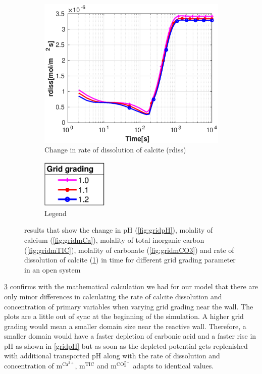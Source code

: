 \begin{figure}[!h]
        \hfill
        \begin{subfigure}{.5\linewidth}
            \centering
        \includegraphics[width=\textwidth]{PICTURES/with_grid_rdiss.eps}
        \caption{Change in rate of dissolution of calcite (rdiss)}
        \label{fig:gridrdiss}
    \end{subfigure}%
        \hfill
        \begin{subfigure}{.5\linewidth}
            \centering
        \includegraphics[width=0.35\textwidth]{PICTURES/with_grid_legend.eps}
        \caption{Legend}
        \label{fig:gridlegend}
    \end{subfigure}%
    \caption{\DuMuX results that show the change in pH (\cref{fig:gridpH}), molality of calcium (\cref{fig:gridmCa}), 
    molality of total inorganic carbon (\cref{fig:gridmTIC}), molality of carbonate (\cref{fig:gridmCO3}) 
    and rate of dissolution of calcite (\cref{fig:gridrdiss}) in time for different grid grading parameter in an open system}
    \label{fig:diffGrid}
\end{figure}

\cref{fig:diffGrid} confirms with the mathematical calculation we had for our model that there are only minor differences 
in calculating the rate of calcite dissolution and concentration of primary variables when varying grid grading near the wall. 
The plots are a little out of sync at the beginning of the simulation. A higher grid grading would mean a smaller domain size near 
the reactive wall. Therefore, a smaller domain would have a faster depletion of carbonic acid and a faster rise in pH as shown in \cref{gridpH} but 
as soon as the depleted potential gets replenished with additional transported  pH along with the rate of dissolution and concentration of 
$\mathrm{m^{Ca^{2+}}}$, $\mathrm{m^{TIC}}$ and $\mathrm{m^{CO_3^{2-}}}$ adapts to identical values. 

